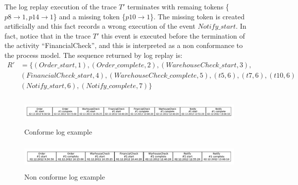 \documentclass{llncs}
\begin{document}
The log replay execution of the trace $T'$ terminates with remaing tokens \{${p8 \rightarrow 1,p14 \rightarrow 1}$\} and a missing token \{${p10 \rightarrow 1}$\}. The missing token is created artificially and this fact records a wrong execution of the event $Notify\_start$. In fact, notice that in the trace $T'$ this event is executed before the termination of the activity ``FinancialCheck'', and this is interpreted as a non conformance to the process model. The sequence returned by log replay is:
\begin{equation}
\begin{split}
R'&=\{(Order\_start,1), (Order\_complete,2), (WarehouseCheck\_start,3), \\
& (FinancialCheck\_start,4), (WarehouseCheck\_complete,5),(t5,6),(t7,6), (t10,6)\\
& (Notify\_start,6), (Notify\_complete,7)\}
\end{split}
\end{equation}

\begin{figure}[t]
\centering
\includegraphics[width=400pt,height=40pt]
{./items/logConforme.pdf}
\caption{Conforme log example}
\label{ConfLog}
\end{figure}

\begin{figure}[h]
\centering
\includegraphics[width=400pt,height=40pt]
{./items/logNonConforme.pdf}
\caption{Non conforme log example}
\label{NonConfLog}
\end{figure}
\end{document}
